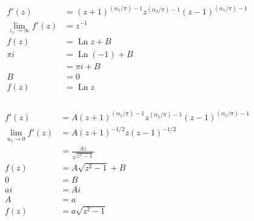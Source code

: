 \documentclass{article}
\newcommand{\Ln}{\operatorname{Ln}}
\begin{document}
\begin{align*}
  f'(z)                               & = (z + 1)^{(\alpha_1 / \pi) - 1} z^{(\alpha_2 / \pi) - 1} (z - 1)^{(\alpha_1 / \pi) - 1} \\
  \lim_{z_1 \rightarrow \infty} f'(z) & = z^{-1}                                                                                 \\
  f(z)                                & = \Ln z + B                                                                              \\
  \pi i                               & = \Ln (-1) + B                                                                           \\
                                      & = \pi i + B                                                                              \\
  B                                   & = 0                                                                                      \\
  f(z)                                & = \Ln z
\end{align*}

\setcounter{subsubsection}{12}
\subsubsection{}

\begin{align*}
  f'(z)                          & = A (z + 1)^{(\alpha_1 / \pi) - 1} z^{(\alpha_2 / \pi) - 1} (z - 1)^{(\alpha_1 / \pi) - 1} \\
  \lim_{u_1 \rightarrow 0} f'(z) & = A (z + 1)^{-1 / 2} z (z - 1)^{-1 / 2}                                                    \\
                                 & = \frac{A z}{\sqrt{z^2 - 1}}                                                               \\
  f(z)                           & = A \sqrt{z^2 - 1} + B                                                                     \\
  0                              & = B                                                                                        \\
  a i                            & = A i                                                                                      \\
  A                              & = a                                                                                        \\
  f(z)                           & = a \sqrt{z^2 - 1}
\end{align*}
\end{document}
